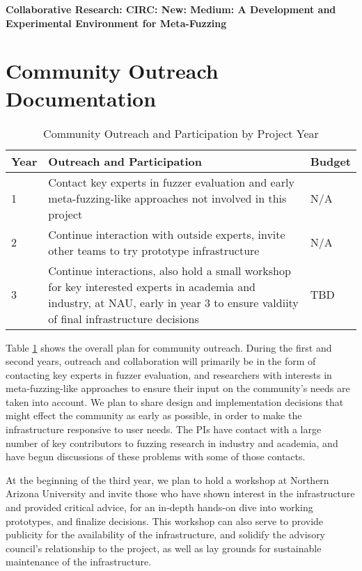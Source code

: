 \documentclass[12pt]{article}
\begin{document}
\begin{center} {\Large\sf\textbf{Collaborative Research: CIRC: New: Medium: A
      Development and Experimental Environment for Meta-Fuzzing}}
\end{center}

\section*{Community Outreach Documentation}


\begin{table}[b]
  \begin{tabular}{|l|p{10cm}|l|}
    {\bf Year} & {\bf Outreach and Participation} & {Budget} \\
    \hline
    1 & Contact key experts in fuzzer evaluation and early meta-fuzzing-like
        approaches not involved in this project & N/A \\
    2 & Continue interaction with outside experts, invite other teams to try
        prototype infrastructure & N/A \\
    3 & Continue interactions, also hold a small workshop for key interested
        experts in academia and industry, at NAU, early in year 3 to ensure
        valdiity of final infrastructure decisions & TBD \\
  \end{tabular}
  \caption{Community Outreach and Participation by Project Year}
  \label{tab:outreach}
  
\end{table}


Table \ref{tab:outreach} shows the overall plan for community outreach.  During
the first and second years, outreach and collaboration will primarily be in the
form of contacting key experts in fuzzer evaluation, and researchers with
interests in meta-fuzzing-like approaches to ensure their input on the
community's needs are taken into account.  We plan to share design and
implementation decisions that might effect the community as early as possible,
in order to make the infrastructure responsive to user needs.  The PIs have
contact with a large number of key contributors to fuzzing research in industry
and academia, and have begun discussions of these problems with some of those
contacts.

At the beginning of the third year, we plan to hold a workshop at Northern
Arizona University and invite those who have shown interest in the
infrastructure and provided critical advice, for an in-depth hands-on dive into
working prototypes, and finalize decisions.  This workshop can also serve to
provide publicity for the availability of the infrastructure, and solidify the
advisory council's relationship to the project, as well as lay grounds for
sustainable maintenance of the infrastructure.
\end{document}
